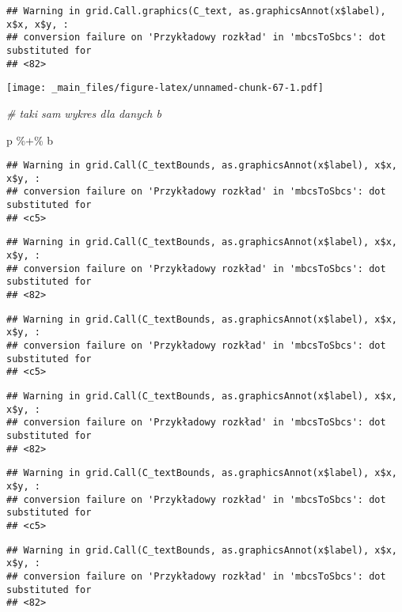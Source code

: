 \documentclass[
]{book}
\newenvironment{Shaded}{\begin{snugshade}}{\end{snugshade}}
\newcommand{\CommentTok}[1]{\textcolor[rgb]{0.56,0.35,0.01}{\textit{#1}}}
\newcommand{\NormalTok}[1]{#1}
\newcommand{\SpecialCharTok}[1]{\textcolor[rgb]{0.00,0.00,0.00}{#1}}
\begin{document}
\begin{verbatim}
## Warning in grid.Call.graphics(C_text, as.graphicsAnnot(x$label), x$x, x$y, :
## conversion failure on 'Przykładowy rozkład' in 'mbcsToSbcs': dot substituted for
## <82>
\end{verbatim}

\texttt{[image: \_main\_files/figure-latex/unnamed-chunk-67-1.pdf]}

\begin{Shaded}
\begin{Highlighting}[]
\CommentTok{\# taki sam wykres dla danych b}

\NormalTok{p }\SpecialCharTok{\%+\%}\NormalTok{ b}
\end{Highlighting}
\end{Shaded}

\begin{verbatim}
## Warning in grid.Call(C_textBounds, as.graphicsAnnot(x$label), x$x, x$y, :
## conversion failure on 'Przykładowy rozkład' in 'mbcsToSbcs': dot substituted for
## <c5>
\end{verbatim}

\begin{verbatim}
## Warning in grid.Call(C_textBounds, as.graphicsAnnot(x$label), x$x, x$y, :
## conversion failure on 'Przykładowy rozkład' in 'mbcsToSbcs': dot substituted for
## <82>
\end{verbatim}

\begin{verbatim}
## Warning in grid.Call(C_textBounds, as.graphicsAnnot(x$label), x$x, x$y, :
## conversion failure on 'Przykładowy rozkład' in 'mbcsToSbcs': dot substituted for
## <c5>
\end{verbatim}

\begin{verbatim}
## Warning in grid.Call(C_textBounds, as.graphicsAnnot(x$label), x$x, x$y, :
## conversion failure on 'Przykładowy rozkład' in 'mbcsToSbcs': dot substituted for
## <82>
\end{verbatim}

\begin{verbatim}
## Warning in grid.Call(C_textBounds, as.graphicsAnnot(x$label), x$x, x$y, :
## conversion failure on 'Przykładowy rozkład' in 'mbcsToSbcs': dot substituted for
## <c5>
\end{verbatim}

\begin{verbatim}
## Warning in grid.Call(C_textBounds, as.graphicsAnnot(x$label), x$x, x$y, :
## conversion failure on 'Przykładowy rozkład' in 'mbcsToSbcs': dot substituted for
## <82>
\end{verbatim}
\end{document}
